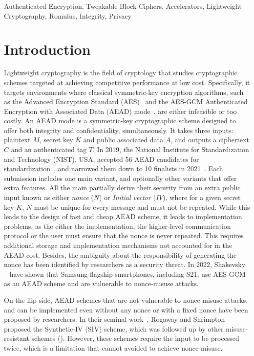 \documentclass[conference]{IEEEtran}
\begin{document}
\begin{IEEEkeywords}
Authenticated Encryption, Tweakable Block Ciphers, Accelerators, Lightweight Cryptography, Romulus, Integrity, Privacy
\end{IEEEkeywords}

\section{Introduction}

Lightweight cryptography is the field of cryptology that studies cryptographic schemes targeted at achieving competitive performance at low cost. Specifically, it targets environments where classical symmetric-key encryption algorithms, such as the Advanced Encryption Standard (AES)~\cite{daemen2001reijndael} and the AES-GCM Authenticated Encryption with Associated Data (AEAD) mode~\cite{mcgrew2004galois}, are either infeasible or too costly. An AEAD mode is a symmetric-key cryptographic scheme designed to offer both integrity and confidentiality, simultaneously. It takes three inputs: plaintext $M$, secret key $K$ and public associated data $A$, and outputs a ciphertext $C$ and an authenticated tag $T$. In 2019, the National Institute for Standardization and Technology (NIST), USA, accepted 56 AEAD candidates for standardization~\cite{turan2019status}, and narrowed them down to 10 finalists in 2021~\cite{turan2021status}. Each submission includes one main variant, and optionally other variants that offer extra features. All the main partially derive their security from an extra public input known as either {\it nonce} ($N$) or {\it Initial vector} ($IV$), where for a given secret key $K$, $N$ must be unique for every message and must not be repeated. While this leads to the design of fast and cheap AEAD scheme, it leads to implementation problems, as the either the implementation, the higher-level communication protocol or the user must ensure that the nonce is never repeated. This requires additional storage and implementation mechanisms not accounted for in the AEAD cost. Besides, the ambiguity about the responsibility of generating the nonce has been identified by researchers as a security threat. In 2022, Shakevsky \etal~\cite{shakevsky2022trust} have shown that Samsung flagship smartphones, including S21, use AES-GCM as an AEAD scheme and are vulnerable to nonce-misuse attacks.

On the flip side, AEAD schemes that are not vulnerable to nonce-misuse attacks, and can be implemented even without any nonce or with a fixed nonce have been proposed by researchers. In their seminal work~\cite{rogaway2006provable}, Rogaway and Shrimpton proposed the Synthetic-IV (SIV) scheme, which was followed up by other misuse-resistant schemes (\cite{jean2016deoxys,gueron2017aes}). However, these schemes require the input to be processed twice, which is a limitation that cannot avoided to achieve nonce-misuse.
\end{document}
